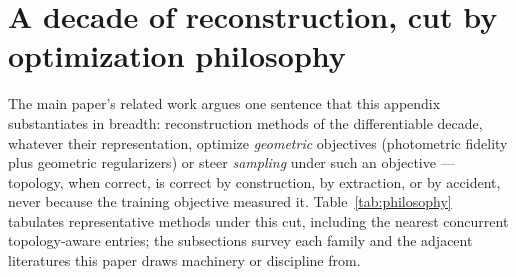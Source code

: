 \section{A decade of reconstruction, cut by optimization philosophy}
\label{app:survey}


The main paper's related work argues one sentence that this appendix
substantiates in breadth: reconstruction methods of the differentiable
decade, whatever their representation, optimize \emph{geometric}
objectives (photometric fidelity plus geometric regularizers) or steer
\emph{sampling} under such an objective --- topology, when correct, is
correct by construction, by extraction, or by accident, never because
the training objective measured it. Table~\ref{tab:philosophy}
tabulates representative methods under this cut, including the nearest
concurrent topology-aware entries; the subsections survey each family
and the adjacent literatures this paper draws machinery or discipline
from.

